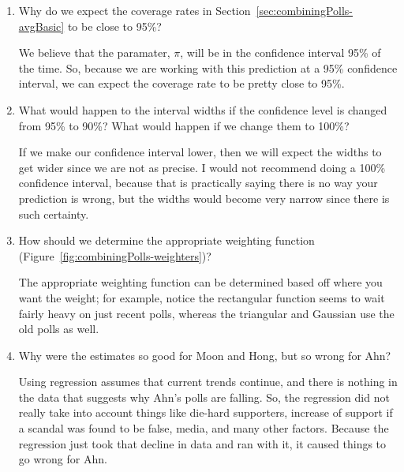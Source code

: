 \begin{enumerate}
 \item Why do we expect the coverage rates in Section~\ref{sec:combiningPolls-avgBasic} to be close to 95\%?
\begin{solution}
We believe that the paramater, $\pi$, will be in the confidence interval 95\% of the time. So, because we are working with this prediction at a 95\% confidence interval, we can expect the coverage rate to be pretty close to 95\%. 
\end{solution}

 \item What would happen to the interval widths if the confidence level is changed from 95\% to 90\%? What would happen if we change them to 100\%?
\begin{solution}
If we make our confidence interval lower, then we will expect the widths to get wider since we are not as precise. I would not recommend doing a 100\% confidence interval, because that is practically saying there is no way your prediction is wrong, but the widths would become very narrow since there is such certainty.
\end{solution}

 \item How should we determine the appropriate weighting function (Figure~\ref{fig:combiningPolls-weighters})?
\begin{solution}
The appropriate weighting function can be determined based off where you want the weight; for example, notice the rectangular function seems to wait fairly heavy on just recent polls, whereas the triangular and Gaussian use the old polls as well. 
\end{solution}
 \item Why were the estimates so good for Moon and Hong, but so wrong for Ahn?
\begin{solution}
Using regression assumes that current trends continue, and there is nothing in the data that suggests why Ahn's polls are falling. So, the regression did not really take into account things like die-hard supporters, increase of support if a scandal was found to be false, media, and many other factors. Because the regression just took that decline in data and ran with it, it caused things to go wrong for Ahn. 
\end{solution}

\end{enumerate}







